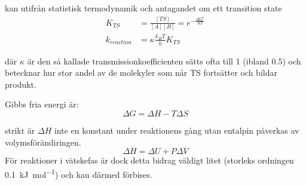 kan utifrån
statistisk termodynamik och antagandet om ett transition state
\begin{align}
  \label{eq:K_TS}
  K_{TS} &=\frac{[TS]}{[A][B]}=e^{-\frac{\Delta G^{\ddag}}{RT}} \\
  \label{eq:k_tst}
  k_{reaction} &=\kappa\frac{k_{B}T}{h}K_{TS}
\end{align}

där $\kappa$ är den så kallade transmissionkoefficienten sätts ofta till
1 (ibland 0.5) och betecknar hur stor andel av de molekyler som når TS
fortsätter och bildar produkt.

Gibbs fria energi är:
\begin{equation}
  \label{eq:gibbs}
  \Delta G = \Delta H - T\Delta S
\end{equation}

strikt är $\Delta H$ inte en konstant under reaktionens gång utan
entalpin påverkas av volymsförändiringen.
\begin{equation}
  \label{eq:enthalpy}
  \Delta H = \Delta U + P\Delta V
\end{equation}
För reaktioner i vätskefas är dock detta bidrag väldigt litet (storleks
ordningen \SI{0.1}{\kilo\joule\per\mole}) och kan därmed förbises.
